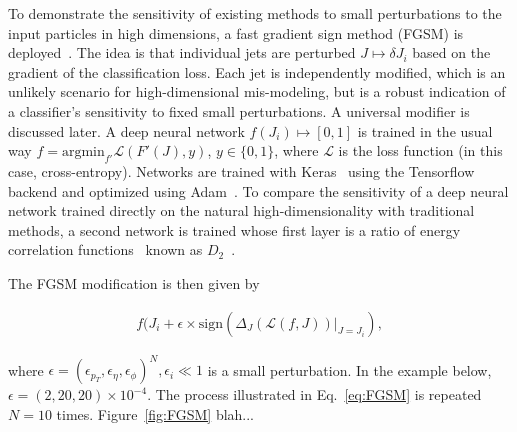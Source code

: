 \documentclass[reprint,nofootinbib,...]{revtex4-1}
\begin{document}
To demonstrate the sensitivity of existing methods to small perturbations to the input particles in high dimensions, a fast gradient sign method (FGSM) is deployed~\cite{DBLP:journals/corr/GoodfellowSS14}.  The idea is that individual jets are perturbed $J\mapsto \delta J_i$ based on the gradient of the classification loss.  Each jet is independently modified, which is an unlikely scenario for high-dimensional mis-modeling, but is a robust indication of a classifier's sensitivity to fixed small perturbations.  A universal modifier is discussed later.  A deep neural network $f(J_i)\mapsto [0,1]$ is trained in the usual way $f=\text{argmin}_{f'}\mathcal{L}(F'(J),y)$, $y\in\{0,1\}$, where $\mathcal{L}$ is the loss function (in this case, cross-entropy).  Networks are trained with Keras~\cite{keras} using the Tensorflow~\cite{tensorflow} backend and optimized using Adam~\cite{adam}.  To compare the sensitivity of a deep neural network trained directly on the natural high-dimensionality with traditional methods, a second network is trained whose first layer is a ratio of energy correlation functions~\cite{Larkoski:2013eya} known as $D_2$~\cite{Larkoski:2014gra}.

The FGSM modification is then given by

\begin{align}
\label{eq:FGSM}
f(J_i+\epsilon\times\text{sign}(\Delta_J(\mathcal{L}(f,J))|_{J=J_i}),
\end{align}

\noindent where $\epsilon=(\epsilon_{p_T},\epsilon_\eta,\epsilon_\phi)^N, \epsilon_i\ll1$ is a small perturbation.  In the example below, $\epsilon=(2,20,20)\times 10^{-4}$.  The process illustrated in Eq.~\ref{eq:FGSM} is repeated $N=10$ times.  Figure~\ref{fig:FGSM} blah...
\end{document}
